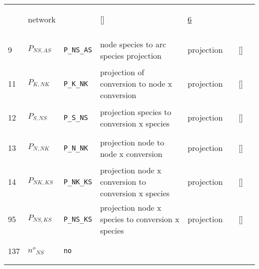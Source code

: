 \begin{longtable}{|p{1cm}|p{3cm}|p{3cm}|p{7cm}|p{3.0cm}|p{3cm}|p{2cm}|p{1cm}|}
             & \begin{lay}network \end{lay}
             & $  $
             & []
             & \hyperlink{"e:6"}{ 6 }
                 \\
    9
             & \hypertarget{"v:9"}{ $ {P}_{{N S}, {A S}} $}
             & \verb|P_NS_AS|
             & node species to arc species projection
             & \begin{lay}projection \end{lay}
             & $  $
             & []
             & \\
    11
             & \hypertarget{"v:11"}{ $ {P}_{K, {N K}} $}
             & \verb|P_K_NK|
             & projection of conversion to node x conversion
             & \begin{lay}projection \end{lay}
             & $  $
             & []
             & \\
    12
             & \hypertarget{"v:12"}{ $ {P}_{S, {N S}} $}
             & \verb|P_S_NS|
             & projection species to conversion x
species
             & \begin{lay}projection \end{lay}
             & $  $
             & []
             & \\
    13
             & \hypertarget{"v:13"}{ $ {P}_{N, {N K}} $}
             & \verb|P_N_NK|
             & projection node to node x conversion
             & \begin{lay}projection \end{lay}
             & $  $
             & []
             & \\
    14
             & \hypertarget{"v:14"}{ $ {P}_{{N K}, {K S}} $}
             & \verb|P_NK_KS|
             & projection node x conversion to conversion x
species
             & \begin{lay}projection \end{lay}
             & $  $
             & []
             & \\
    95
             & \hypertarget{"v:95"}{ $ {P}_{{N S}, {K S}} $}
             & \verb|P_NS_KS|
             & projection node x species to conversion x
species
             & \begin{lay}projection \end{lay}
             & $  $
             & []
             & \\
    137
             & \hypertarget{"v:137"}{ $ {n^{o}}_{{N S}} $}
             & \verb|no|

\end{longtable}
